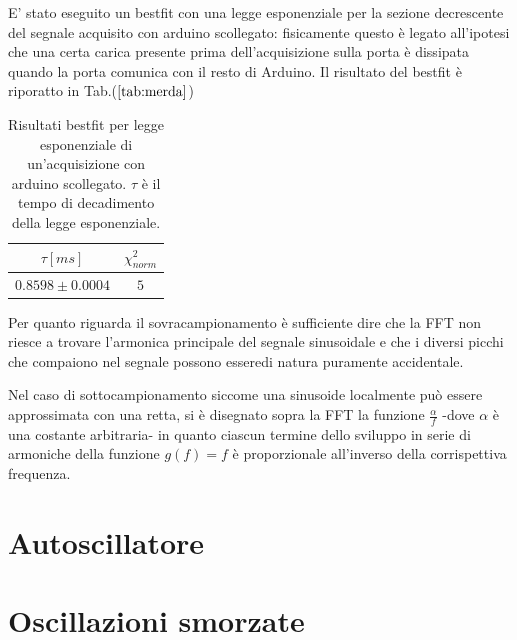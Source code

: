 \documentclass{article}
\begin{document}
    E' stato eseguito un bestfit con una legge esponenziale per la sezione decrescente
    del segnale acquisito con arduino scollegato: fisicamente questo è legato all'ipotesi 
    che una certa carica presente prima dell'acquisizione 
    sulla porta è dissipata quando la porta comunica con il resto di Arduino.
    Il risultato del bestfit è riporatto in Tab.($\ref{tab:merda}$)

        \begin{table}[H]
            \centering
            \begin{tabular}{cc}
                $\tau[ms]$ & $\chi^2_{norm}$\\
                \hline
                $0.8598\pm0.0004$ &$5$\\
            \end{tabular}
        \caption{Risultati bestfit per legge esponenziale di un'acquisizione 
                con arduino scollegato. $\tau$ è il tempo di decadimento della legge 
                esponenziale.}
        \label{tab:merda}
        \end{table}



    Per quanto riguarda il sovracampionamento è sufficiente dire che la 
    FFT non riesce a trovare l'armonica principale del segnale sinusoidale e 
    che i diversi picchi che compaiono nel segnale possono esseredi natura puramente
    accidentale.

    Nel caso di sottocampionamento siccome una sinusoide localmente può 
    essere approssimata con una retta, si è disegnato sopra la FFT la funzione
    $\frac{\alpha}{f}$ -dove $\alpha$ è una costante arbitraria-
    in quanto ciascun termine dello sviluppo in serie  di 
    armoniche della funzione $g(f)=f$ è proporzionale all'inverso della 
    corrispettiva frequenza.







\section{Autoscillatore}

\section{Oscillazioni smorzate}
\end{document}
